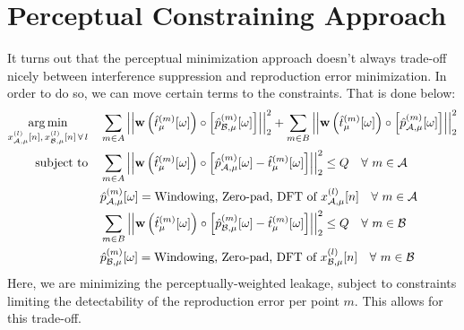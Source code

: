 \section{Perceptual Constraining Approach}
It turns out that the perceptual minimization approach doesn't always trade-off nicely between interference suppression and reproduction error minimization.
In order to do so, we can move certain terms to the constraints.
That is done below:
\begin{equation}
    \begin{align}
        \argmin{x_{\za,\mu}^{(l)}[n],\,x_{\zb,\mu}^{(l)}[n]\,\forall\,l}{
           &\sum_{m\in A} \norm[2][2]{\vec{w}\left(\hat{t}_\mu^{(m)}[\omega]\right) \circ \left[\hat{p}_{\zb,\mu}^{(m)}[\omega]\right]} + 
            \sum_{m\in B} \norm[2][2]{\vec{w}\left(\hat{t}_\mu^{(m)}[\omega]\right) \circ \left[\hat{p}_{\za,\mu}^{(m)}[\omega]\right]}
        }\\
        \subjectto{
           &\sum_{m\in A} \norm[2][2]{\vec{w}\left(\hat{t}_\mu^{(m)}[\omega]\right) \circ \left[\hat{p}_{\za,\mu}^{(m)}[\omega] - \hat{t}_\mu^{(m)}[\omega]\right]} \leq Q 
            \quad\forall\ m\in\za\\
           &\hat{p}_{\za,\mu}^{(m)}[\omega] = \text{Windowing, Zero-pad, DFT of } x_{\za,\mu}^{(l)}[n]\quad\forall\ m\in\za \\
           &\sum_{m\in B} \norm[2][2]{\vec{w}\left(\hat{t}_\mu^{(m)}[\omega]\right) \circ \left[\hat{p}_{\zb,\mu}^{(m)}[\omega] - \hat{t}_\mu^{(m)}[\omega]\right]} \leq Q
            \quad\forall\ m\in\zb\\
           &\hat{p}_{\zb,\mu}^{(m)}[\omega] = \text{Windowing, Zero-pad, DFT of } x_{\zb,\mu}^{(l)}[n]\quad\forall\ m\in\zb \\
       }
    \end{align}
\end{equation}
Here, we are minimizing the perceptually-weighted leakage, subject to constraints limiting the detectability of the reproduction error per point $m$. 
This allows for this trade-off.
